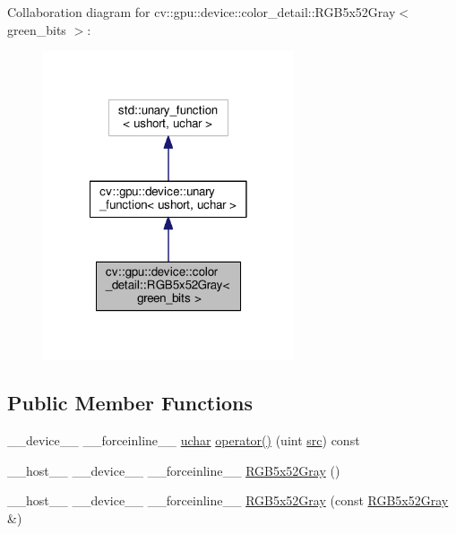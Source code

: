 Collaboration diagram for cv\-:\-:gpu\-:\-:device\-:\-:color\-\_\-detail\-:\-:R\-G\-B5x52\-Gray$<$ green\-\_\-bits $>$\-:\nopagebreak
\begin{figure}[H]
\begin{center}
\leavevmode
\includegraphics[width=210pt]{structcv_1_1gpu_1_1device_1_1color__detail_1_1RGB5x52Gray__coll__graph}
\end{center}
\end{figure}
\subsection*{Public Member Functions}
\begin{DoxyCompactItemize}
\item 
\-\_\-\-\_\-device\-\_\-\-\_\- \-\_\-\-\_\-forceinline\-\_\-\-\_\- \hyperlink{core_2types__c_8h_a65f85814a8290f9797005d3b28e7e5fc}{uchar} \hyperlink{structcv_1_1gpu_1_1device_1_1color__detail_1_1RGB5x52Gray_aca7fb6c9975133880622156efe178d9b}{operator()} (uint \hyperlink{legacy_8hpp_a371cd109b74033bc4366f584edd3dacc}{src}) const 
\item 
\-\_\-\-\_\-host\-\_\-\-\_\- \-\_\-\-\_\-device\-\_\-\-\_\- \-\_\-\-\_\-forceinline\-\_\-\-\_\- \hyperlink{structcv_1_1gpu_1_1device_1_1color__detail_1_1RGB5x52Gray_ac5347ff5271a8d981ab854fc00aec28a}{R\-G\-B5x52\-Gray} ()
\item 
\-\_\-\-\_\-host\-\_\-\-\_\- \-\_\-\-\_\-device\-\_\-\-\_\- \-\_\-\-\_\-forceinline\-\_\-\-\_\- \hyperlink{structcv_1_1gpu_1_1device_1_1color__detail_1_1RGB5x52Gray_af7b15c6ffa194deada2dcf16ae36b0fd}{R\-G\-B5x52\-Gray} (const \hyperlink{structcv_1_1gpu_1_1device_1_1color__detail_1_1RGB5x52Gray}{R\-G\-B5x52\-Gray} \&)
\end{DoxyCompactItemize}


